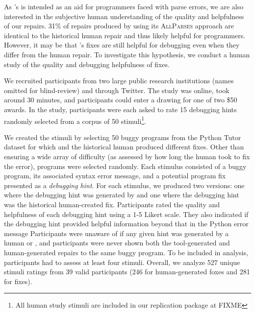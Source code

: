 As \toolname's is intended as an aid for programmers
faced with parse errors, we are also interested in the subjective 
human understanding of the quality
and helpfulness of our repairs. 31\% of repairs produced by \toolname
using its \textsc{AllParses} approach are identical to the historical human repair
and thus likely helpful for programmers. However, it may be that \toolname's fixes
are still helpful for debugging even when they differ from the human
repair. To investigate this hypothesis, we conduct a human study of the quality and
debugging helpfulness of \toolname fixes.

 We recruited participants from two large public
research institutions (names omitted for blind-review) and through Twitter.
The study was online, took around 30 minutes, and participants could enter a
drawing for one of two \$50 awards. In the study, participants
were each asked to rate 15 debugging hints randomly selected from a corpus of 50
stimuli\footnote{All human study stimuli are included in our replication
package at FIXME}.

We created the stimuli by selecting 50 buggy programs from the Python Tutor dataset
for which \toolname and the historical human produced different fixes. Other than
ensuring a wide array of difficulty (as assessed by how long the
human took to fix the error), programs were selected randomly. Each 
stimulus consisted of a buggy program, its associated syntax 
error message, and a potential program fix presented as a \emph{debugging hint}. 
For each stimulus, we produced two versions: one where the debugging hint was 
generated by \toolname and one where the debugging hint was the historical 
human-created fix. 
Participants rated the quality and helpfulness of each debugging
hint using a 1-5 Likert scale.
They also indicated if the debugging hint provided helpful information beyond
that in the Python error message %
Participants were unaware of if any given
hint was generated by a human or \toolname, and participants were never shown both the
tool-generated and human-generated repairs to the same buggy program. To be included
in analysis, participants had to assess at
least four stimuli. Overall, we analyze 527 unique stimuli ratings from 39 valid
participants (246 for human-generated foxes and 281 for \toolname fixes).

